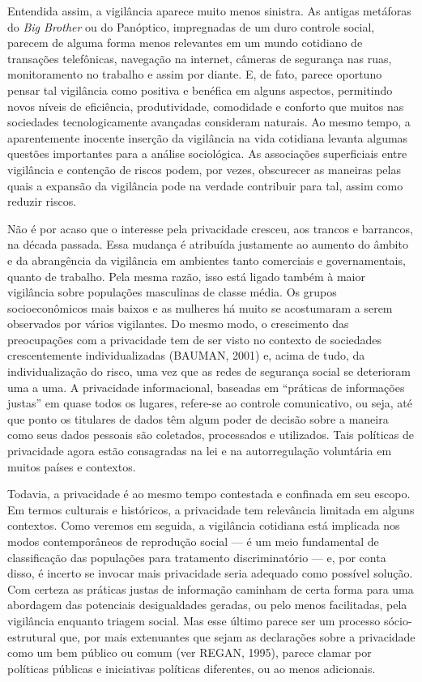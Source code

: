 Entendida assim, a vigilância aparece muito menos sinistra. As antigas
metáforas do \emph{Big Brother} ou do Panóptico, impregnadas de um duro
controle social, parecem de alguma forma menos relevantes em um mundo
cotidiano de transações telefônicas, navegação na internet, câmeras de
segurança nas ruas, monitoramento no trabalho e assim por diante. E, de
fato, parece oportuno pensar tal vigilância como positiva e benéfica em
alguns aspectos, permitindo novos níveis de eficiência, produtividade,
comodidade e conforto que muitos nas sociedades tecnologicamente
avançadas consideram naturais. Ao mesmo tempo, a aparentemente inocente
inserção da vigilância na vida cotidiana levanta algumas questões
importantes para a análise sociológica. As associações superficiais
entre vigilância e contenção de riscos podem, por vezes, obscurecer as
maneiras pelas quais a expansão da vigilância pode na verdade contribuir
para tal, assim como reduzir riscos.

Não é por acaso que o interesse pela privacidade cresceu, aos trancos e
barrancos, na década passada. Essa mudança é atribuída justamente ao
aumento do âmbito e da abrangência da vigilância em ambientes tanto
comerciais e governamentais, quanto de trabalho. Pela mesma razão, isso
está ligado também à maior vigilância sobre populações masculinas de
classe média. Os grupos socioeconômicos mais baixos e as mulheres há
muito se acostumaram a serem observados por vários vigilantes. Do mesmo
modo, o crescimento das preocupações com a privacidade tem de ser visto
no contexto de sociedades crescentemente individualizadas (BAUMAN, 2001)
e, acima de tudo, da individualização do risco, uma vez que as redes de
segurança social se deterioram uma a uma. A privacidade informacional,
baseadas em ``práticas de informações justas'' em quase todos os
lugares, refere-se ao controle comunicativo, ou seja, até que ponto os
titulares de dados têm algum poder de decisão sobre a maneira como seus
dados pessoais são coletados, processados e utilizados. Tais políticas
de privacidade agora estão consagradas na lei e na autorregulação
voluntária em muitos países e contextos.

Todavia, a privacidade é ao mesmo tempo contestada e confinada em seu
escopo. Em termos culturais e históricos, a privacidade tem relevância
limitada em alguns contextos. Como veremos em seguida, a vigilância
cotidiana está implicada nos modos contemporâneos de reprodução social
--- é um meio fundamental de classificação das populações para
tratamento discriminatório --- e, por conta disso, é incerto se invocar
mais privacidade seria adequado como possível solução. Com certeza as
práticas justas de informação caminham de certa forma para uma abordagem
das potenciais desigualdades geradas, ou pelo menos facilitadas, pela
vigilância enquanto triagem social. Mas esse último parece ser um
processo sócio-estrutural que, por mais extenuantes que sejam as
declarações sobre a privacidade como um bem público ou comum (ver REGAN,
1995), parece clamar por políticas públicas e iniciativas políticas
diferentes, ou ao menos adicionais.


